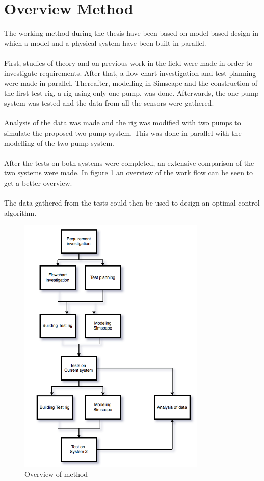 \section{Overview Method}
The working method during the thesis have been based on model based design in which a model and a physical system have been built in parallel.\\ 
\\
First, studies of theory and on previous work in the field were made in order to investigate requirements. After that, a flow chart investigation and test planning were made in parallel. Thereafter, modelling in Simscape and the construction of the first test rig, a rig using only one  pump,  was done. Afterwards, the one pump system was tested and the data from all the sensors were gathered.\\
\\
Analysis of the data was made and the rig was modified with two pumps to simulate the proposed two pump system. This was done in parallel with the modelling of the two pump system. \\
\\
After the tests on both systems were completed, an extensive comparison of the two systems were made. In figure \ref{fig:metod} an overview of the work flow can be seen to get a better overview.\\
\\
The data gathered from the tests could then be used to design an optimal control algorithm. 

\begin{figure}[h]
    \centering
    \includegraphics[width=0.8\textwidth]{Metod}
    \caption{Overview of method}
    \label{fig:metod}
\end{figure}



